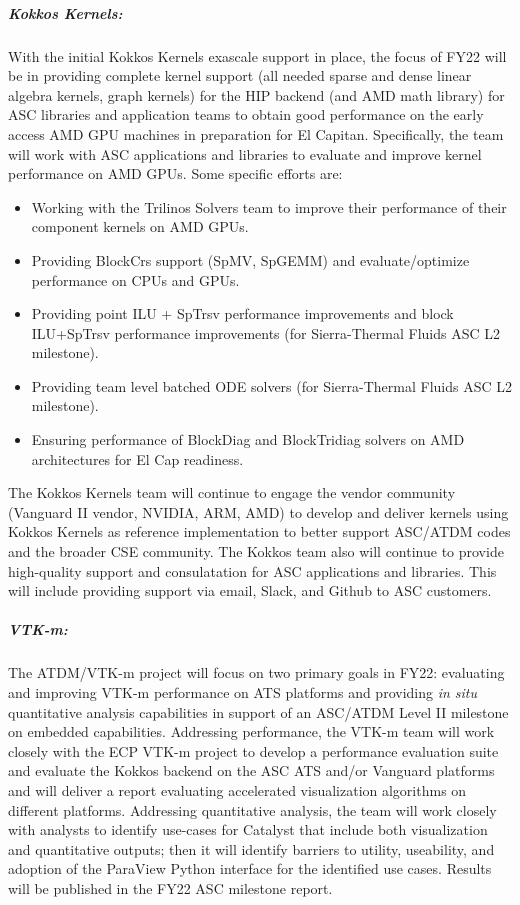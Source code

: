 \subparagraph{Kokkos Kernels:} With the initial Kokkos Kernels exascale support in place, the focus of FY22 will be in providing complete kernel support (all needed sparse and dense linear algebra kernels, graph kernels) for the HIP backend (and AMD math library) for ASC libraries and application teams to obtain good performance on the early access AMD GPU machines in preparation for El Capitan.  Specifically, the team will work with ASC applications and libraries to evaluate and improve kernel performance on AMD GPUs.  Some specific efforts are:
\begin{itemize}
\item Working with the Trilinos Solvers team to improve their performance of their component kernels on AMD GPUs.  
\item Providing BlockCrs support (SpMV, SpGEMM) and evaluate/optimize performance on CPUs and GPUs.  
\item Providing point ILU + SpTrsv performance improvements and block ILU+SpTrsv performance improvements (for Sierra-Thermal Fluids ASC L2 milestone).  
\item Providing team level batched ODE solvers (for Sierra-Thermal Fluids ASC L2 milestone).  
\item Ensuring performance of BlockDiag and BlockTridiag solvers on AMD architectures for El Cap readiness.
\end{itemize}

The Kokkos Kernels team will continue to engage the vendor community (Vanguard II vendor, NVIDIA, ARM, AMD) to develop and deliver kernels using Kokkos Kernels as reference implementation to better support ASC/ATDM codes and the broader CSE community.  The Kokkos team also will continue to provide high-quality support and consulatation for ASC applications and libraries.  This will include providing support via email, Slack, and Github to ASC customers.

 
\subparagraph{VTK-m:} The ATDM/VTK-m project will focus on two primary goals in FY22: evaluating and improving VTK-m performance on ATS platforms and providing \emph{in situ} quantitative analysis capabilities in support of an ASC/ATDM Level II milestone on embedded capabilities.   Addressing performance, the VTK-m team will work closely with the ECP VTK-m project to develop a performance evaluation suite and evaluate the Kokkos backend on the ASC ATS and/or Vanguard platforms and will deliver a report evaluating accelerated visualization algorithms on different platforms.  Addressing quantitative analysis, the team will work closely with analysts to identify use-cases for Catalyst that include both visualization and quantitative outputs; then it will identify barriers to utility, useability, and adoption of the ParaView Python interface for the identified use cases.  Results will be published in the FY22 ASC milestone report. 

